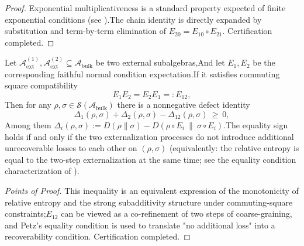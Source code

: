 \begin{proof}
Exponential multiplicativeness is a standard property expected of finite exponential conditions (see \cite{PimsnerPopa1986EntropyIndexSubfactors,Hiai1991MinimumIndexSubfactorsEntropyII}).The chain identity is directly expanded by substitution and term-by-term elimination of \(E_{20}=E_{10}\circ E_{21}\). Certification completed.\end{proof}

\begin{proposition}\label{prop:dephys-commuting-square-mutual-information-defect}Let \(\mathcal{A}_{\mathrm{ext}}^{(1)},\mathcal{A}_{\mathrm{ext}}^{(2)}\subseteq\mathcal{A}_{\mathrm{bulk}}\) be two external subalgebras,And let \(E_1,E_2\) be the corresponding faithful normal condition expectation.If it satisfies commuting square compatibility\[
E_1E_2=E_2E_1=:E_{12},
\]
Then for any \(\rho,\sigma\in\mathcal{S}(\mathcal{A}_{\mathrm{bulk}})\) there is a nonnegative defect identity\begin{equation}\label{eq:dephys-mutual-information-defect}
\boxed{\;
\Delta_{1}(\rho,\sigma)+\Delta_{2}(\rho,\sigma)-\Delta_{12}(\rho,\sigma)\ \ge\ 0,\;}
\end{equation}
Among them \(\Delta_i(\rho,\sigma):=D(\rho\|\sigma)-D(\rho\circ E_i\ \|\ \sigma\circ E_i)\).The equality sign holds if and only if the two externalization processes do not introduce additional unrecoverable losses to each other on \((\rho,\sigma)\) (equivalently: the relative entropy is equal to the two-step externalization at the same time; see the equality condition characterization of \cite{Petz2003MonotonicityRelativeEntropyRevisited}).\end{proposition}

\begin{proof}[Points of Proof]This inequality is an equivalent expression of the monotonicity of relative entropy and the strong subadditivity structure under commuting-square constraints;\(E_{12}\) can be viewed as a co-refinement of two steps of coarse-graining, and Petz's equality condition is used to translate "no additional loss" into a recoverability condition. Certification completed.\end{proof}

